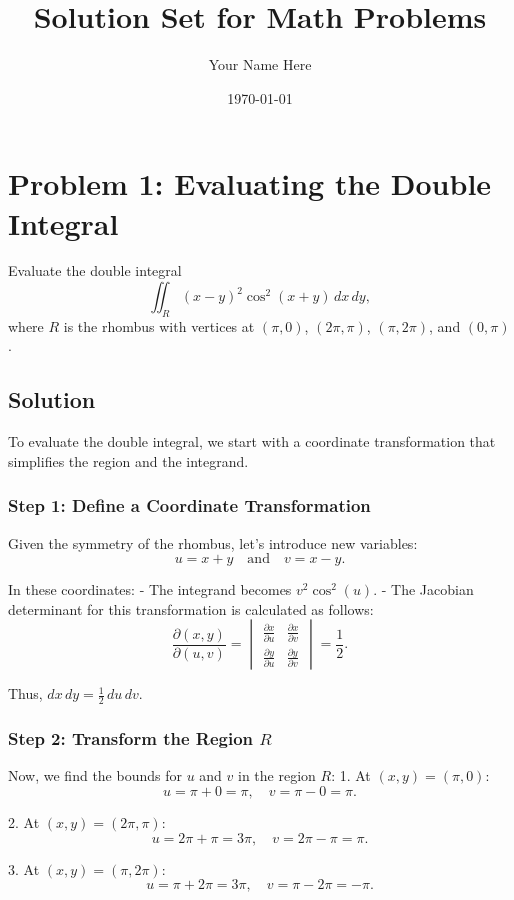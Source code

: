 \documentclass{article}
\title{Solution Set for Math Problems}
\author{Your Name Here}
\date{\today}
\begin{document}
\maketitle

\section*{Problem 1: Evaluating the Double Integral}
Evaluate the double integral 
\[
\iint_R (x - y)^2 \cos^2(x + y) \, dx \, dy,
\]
where \( R \) is the rhombus with vertices at \( (\pi, 0) \), \( (2\pi, \pi) \), \( (\pi, 2\pi) \), and \( (0, \pi) \).

\subsection*{Solution}
To evaluate the double integral, we start with a coordinate transformation that simplifies the region and the integrand.

\subsubsection*{Step 1: Define a Coordinate Transformation}
Given the symmetry of the rhombus, let’s introduce new variables:
\[
u = x + y \quad \text{and} \quad v = x - y.
\]

In these coordinates:
- The integrand becomes \( v^2 \cos^2(u) \).
- The Jacobian determinant for this transformation is calculated as follows:
\[
\frac{\partial(x, y)}{\partial(u, v)} = 
\begin{vmatrix}
\frac{\partial x}{\partial u} & \frac{\partial x}{\partial v} \\
\frac{\partial y}{\partial u} & \frac{\partial y}{\partial v}
\end{vmatrix} = \frac{1}{2}.
\]

Thus, \( dx \, dy = \frac{1}{2} \, du \, dv \).

\subsubsection*{Step 2: Transform the Region \( R \)}
Now, we find the bounds for \( u \) and \( v \) in the region \( R \):
1. At \( (x, y) = (\pi, 0) \):
   \[
   u = \pi + 0 = \pi, \quad v = \pi - 0 = \pi.
   \]

2. At \( (x, y) = (2\pi, \pi) \):
   \[
   u = 2\pi + \pi = 3\pi, \quad v = 2\pi - \pi = \pi.
   \]

3. At \( (x, y) = (\pi, 2\pi) \):
   \[
   u = \pi + 2\pi = 3\pi, \quad v = \pi - 2\pi = -\pi.
   \]
\end{document}
